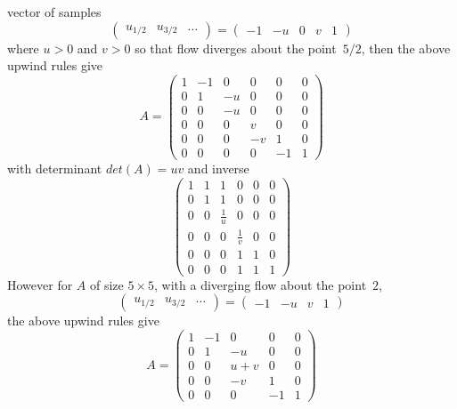 vector of samples
\begin{equation} \label{eq:matdi0}
\begin{pmatrix}
u_{1/2} & u_{3/2} & \ldots 
\end{pmatrix}
=
\begin{pmatrix}
-1 & -u & 0 & v & 1
\end{pmatrix}
\end{equation}
where $u>0$ and $v>0$ so that flow diverges about the point~$5/2$, then the above upwind rules give
\begin{equation}\label{eq:matdi1}
A=\begin{pmatrix}
1 & -1 & 0 & 0 & 0 & 0\\
0 & 1 & -u & 0 & 0 & 0\\
0 & 0 & -u & 0 & 0 & 0\\
0 & 0 & 0 & v & 0 & 0\\
0 & 0 & 0 & -v & 1 & 0\\
0 & 0 & 0 & 0 & -1 & 1
\end{pmatrix}
\end{equation}
with determinant $det(A)=uv$ and inverse
\begin{equation}\label{eq:matdi2}
\begin{pmatrix}
1 & 1 & 1 & 0 & 0 & 0\\
0 & 1 & 1 & 0 & 0 & 0\\
0 & 0 & \frac{1}{u} & 0 & 0 & 0\\
0 & 0 & 0 & \frac{1}{v} & 0 & 0\\
0 & 0 & 0 & 1 & 1 & 0\\
0 & 0 & 0 & 1 & 1 & 1
\end{pmatrix}
\end{equation}
However for $A$ of size $5\times5$, with a diverging flow about the point~$2$,
\begin{equation} \label{eq:matodi0}
\begin{pmatrix}
u_{1/2} & u_{3/2} & \ldots 
\end{pmatrix}
=
\begin{pmatrix}
-1 & -u &  v & 1
\end{pmatrix}
\end{equation}
the above upwind rules give
\begin{equation}\label{eq:matdi3}
A=\begin{pmatrix}
1 & -1 & 0 & 0 & 0\\
0 & 1 & -u & 0 & 0\\
0 & 0 & u+v & 0 & 0\\
0 & 0 & -v & 1 & 0\\
0 & 0 & 0 & -1 & 1
\end{pmatrix}
\end{equation}
